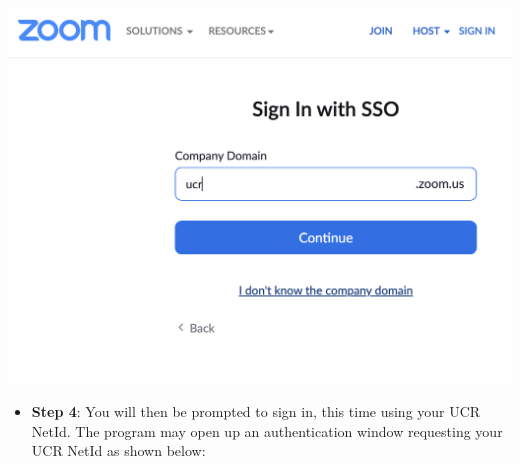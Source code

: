 \documentclass[
]{book}
\providecommand{\tightlist}{%
  \setlength{\itemsep}{0pt}\setlength{\parskip}{0pt}}
\begin{document}
\begin{center}\includegraphics{images/zoomdomain} \end{center}

\begin{itemize}
\tightlist
\item
  \textbf{Step 4}: You will then be prompted to sign in, this time using your UCR NetId. The program may open up an authentication window requesting your UCR NetId as shown below:
\end{itemize}
\end{document}
